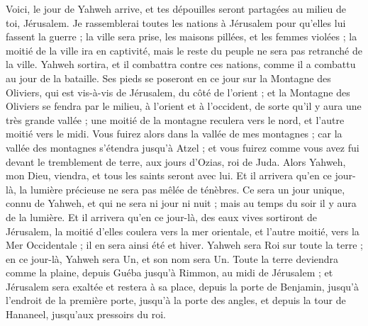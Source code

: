 \begin{multicols}{2}
\VerseOne{}Voici, le jour de Yahweh arrive, et tes dépouilles seront partagées au milieu de toi, Jérusalem.
Je rassemblerai toutes les nations à Jérusalem pour qu'elles lui fassent la guerre ; la ville sera prise, les maisons pillées, et les femmes violées ; la moitié de la ville ira en captivité, mais le reste du peuple ne sera pas retranché de la ville.
Yahweh sortira, et il combattra contre ces nations, comme il a combattu au jour de la bataille.
Ses pieds se poseront en ce jour sur la Montagne des Oliviers, qui est vis-à-vis de Jérusalem, du côté de l'orient ; et la Montagne des Oliviers se fendra par le milieu, à l'orient et à l'occident, de sorte qu'il y aura une très grande vallée ; une moitié de la montagne reculera vers le nord, et l'autre moitié vers le midi.
Vous fuirez alors dans la vallée de mes montagnes ; car la vallée des montagnes s'étendra jusqu'à Atzel ; et vous fuirez comme vous avez fui devant le tremblement de terre, aux jours d'Ozias, roi de Juda. Alors Yahweh, mon Dieu, viendra, et tous les saints seront avec lui.
Et il arrivera qu'en ce jour-là, la lumière précieuse ne sera pas mêlée de ténèbres.
Ce sera un jour unique, connu de Yahweh, et qui ne sera ni jour ni nuit ; mais au temps du soir il y aura de la lumière.
Et il arrivera qu'en ce jour-là, des eaux vives sortiront de Jérusalem, la moitié d'elles coulera vers la mer orientale, et l'autre moitié, vers la Mer Occidentale ; il en sera ainsi été et hiver.
Yahweh sera Roi sur toute la terre ; en ce jour-là, Yahweh sera Un, et son nom sera Un.
Toute la terre deviendra comme la plaine, depuis Guéba jusqu'à Rimmon, au midi de Jérusalem ; et Jérusalem sera exaltée et restera à sa place, depuis la porte de Benjamin, jusqu'à l'endroit de la première porte, jusqu'à la porte des angles, et depuis la tour de Hananeel, jusqu'aux pressoirs du roi.

\end{multicols}
